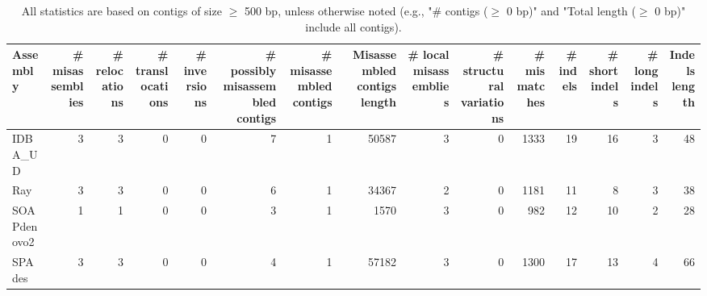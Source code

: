 \documentclass[12pt,a4paper]{article}
\begin{document}
\begin{table}[ht]
\begin{center}
\caption{All statistics are based on contigs of size $\geq$ 500 bp, unless otherwise noted (e.g., "\# contigs ($\geq$ 0 bp)" and "Total length ($\geq$ 0 bp)" include all contigs).}
\begin{tabular}{|l*{14}{|r}|}
\hline
Assembly & \# misassemblies &     \# relocations &     \# translocations &     \# inversions & \# possibly misassembled contigs & \# misassembled contigs & Misassembled contigs length & \# local misassemblies & \# structural variations & \# mismatches & \# indels &     \# short indels &     \# long indels & Indels length \\ \hline
IDBA\_UD & 3 & 3 & 0 & 0 & 7 & 1 & 50587 & 3 & 0 & 1333 & 19 & 16 & 3 & 48 \\ \hline
Ray & 3 & 3 & 0 & 0 & 6 & 1 & 34367 & 2 & 0 & 1181 & 11 & 8 & 3 & 38 \\ \hline
SOAPdenovo2 & 1 & 1 & 0 & 0 & 3 & 1 & 1570 & 3 & 0 & 982 & 12 & 10 & 2 & 28 \\ \hline
SPAdes & 3 & 3 & 0 & 0 & 4 & 1 & 57182 & 3 & 0 & 1300 & 17 & 13 & 4 & 66 \\ \hline
\end{tabular}
\end{center}
\end{table}
\end{document}
